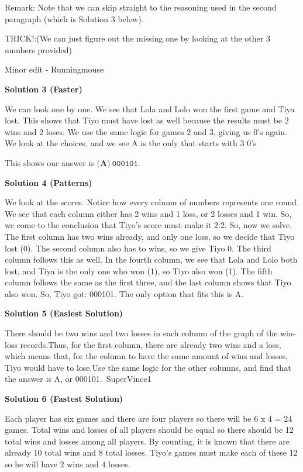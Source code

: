 \begin{enumerate}
 Remark: Note that we can skip straight to the reasoning used in the second paragraph (which is Solution 3 below).

 TRICK!:(We can just figure out the missing one by looking at the other 3 numbers provided)

 Minor edit - Runningmouse

 



\textbf{Solution 3 (Faster)}

We can look one by one. We see that Lola and Lolo won the first game and Tiya lost. This shows that Tiyo must have lost as well because the results must be $2$ wins and $2$ loses. We use the same logic for games $2$ and $3$, giving us $0$'s again. We look at the choices, and we see A is the only that starts with $3$ $0$'s

 This shows our answer is $\boxed{\textbf{(A)}\ \texttt{000101}}.$




\textbf{Solution 4 (Patterns)}

We look at the scores. Notice how every column of numbers represents one round. We see that each column either has 2 wins and 1 loss, or 2 losses and 1 win. So, we come to the conclusion that Tiyo’s score must make it 2:2. So, now we solve. The first column has two wins already, and only one loss, so we decide that Tiyo lost (0). The second column also has to wins, so we give Tiyo 0. The third column follows this as well. In the fourth column, we see that Lola and Lolo both lost, and Tiya is the only one who won (1), so Tiyo also won (1). The fifth column follows the same as the first three, and the last column shows that Tiyo also won. So, Tiyo got: 000101. The only option that fits this is A.

 



\textbf{Solution 5 (Easiest Solution)}

There should be two wins and two losses in each column of the graph of the win-loss records.Thus, for the first column, there are already two wins and a loss, which means that, for the column to have the same amount of wins and losses, Tiyo would have to lose.Use the same logic for the other columns, and find that the answer is A, or 000101.~SuperVince1

 



\textbf{Solution 6 (Fastest Solution)}

Each player has six games and there are four players so there will be 6 x 4 = 24 games. Total wins and losses of all players should be equal so there should be 12 total wins and losses among all players. By counting, it is known that there are already 10 total wins and 8 total losses. Tiyo's games must make each of these 12 so he will have 2 wins and 4 losses. 


\end{enumerate}
